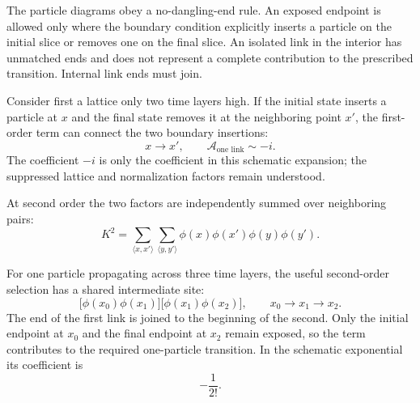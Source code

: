 The particle diagrams obey a no-dangling-end rule. An exposed endpoint is allowed only where the boundary condition explicitly inserts a particle on the initial slice or removes one on the final slice. An isolated link in the interior has unmatched ends and does not represent a complete contribution to the prescribed transition. Internal link ends must join.

Consider first a lattice only two time layers high. If the initial state inserts a particle at \(x\) and the final state removes it at the neighboring point \(x'\), the first-order term can connect the two boundary insertions:
\begin{equation}
x\longrightarrow x',
\qquad
\mathcal{A}_{\text{one link}}\sim -i.
\end{equation}
The coefficient \(-i\) is only the coefficient in this schematic expansion; the suppressed lattice and normalization factors remain understood.

\begin{classroomqa}
\end{classroomqa}

At second order the two factors are independently summed over neighboring pairs:
\begin{equation}
K^2
=
\sum_{\langle x,x'\rangle}
\sum_{\langle y,y'\rangle}
\phi(x)\phi(x')\phi(y)\phi(y').
\end{equation}

\begin{classroomqa}
\end{classroomqa}

For one particle propagating across three time layers, the useful second-order selection has a shared intermediate site:
\begin{equation}
\bigl[\phi(x_0)\phi(x_1)\bigr]
\bigl[\phi(x_1)\phi(x_2)\bigr],
\qquad
x_0\longrightarrow x_1\longrightarrow x_2.
\end{equation}
The end of the first link is joined to the beginning of the second. Only the initial endpoint at \(x_0\) and the final endpoint at \(x_2\) remain exposed, so the term contributes to the required one-particle transition. In the schematic exponential its coefficient is
\begin{equation}
-\frac{1}{2!}.
\end{equation}

